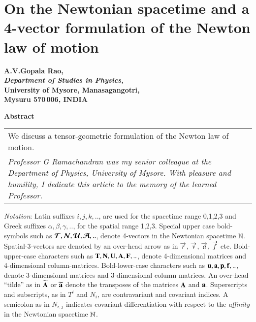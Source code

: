 \chapter{On the Newtonian spacetime and a 4-vector formulation of the Newton law of motion}\label{chap16}


\begin{center}
\textbf{A.V.Gopala Rao,}\\
\textbf{\textit{Department of  Studies in Physics,}}\\
\textbf{University of Mysore, Manasagangotri,}\\
\textbf{Mysuru 570\,006, INDIA}
\end{center}

\medskip
\begin{center}
\textbf{Abstract}
\medskip

\begin{tabular}{p{8cm}} 
We discuss a tensor-geometric formulation of the Newton law of motion.\\[3pt]
\textsl{Professor G Ramachandran was my senior colleague at the Department of Physics, University of Mysore. With pleasure and humility, I dedicate this article to the memory of the learned Professor.}
\end{tabular}
\end{center}

\noindent
\textsl{Notation}: Latin suffixes  $i,j,k,..$, are used for the spacetime range 0,1,2,3 and Greek suffixes  $\alpha, \beta, \gamma, ..$, for the spatial  range 1,2,3. Special upper case bold-symbols such as $\bm{\mathcal{T}}, \bm{\mathcal{N}}, \bm{\mathcal{U}},\bm{\mathcal{A}},..$,  denote 4-vectors in the Newtonian spacetime $\mathbb{N}$.  Spatial-3-vectors are denoted by an over-head arrow as in $\overrightarrow{r}$,  $\overrightarrow{v}$,  $\overrightarrow{a}$, $\overrightarrow{f}$ etc. Bold-upper-case characters such as $\mathbf{T,N,U,A,F},..$, denote 4-dimensional matrices and 4-dimensional column-matrices. Bold-lower-case characters such as $\mathbf{u,a,p,f},..$, denote 3-dimensional matrices and 3-dimensional column matrices.  An over-head ``tilde'' as in $\widetilde{\mathbf{A}}$ or  $\widetilde{\mathbf{a}}$ denote the transposes of the matrices  $\mathbf{A}$ and $\mathbf{a}$. Superscripts and subscripts, as in  $T^i$ and  $N_i$, are contravariant and covariant indices. A semicolon as in $N_{i;j}$ indicates  covariant differentiation with respect to the \textsl{affinity} in the Newtonian spacetime $\mathbb{N}$.

